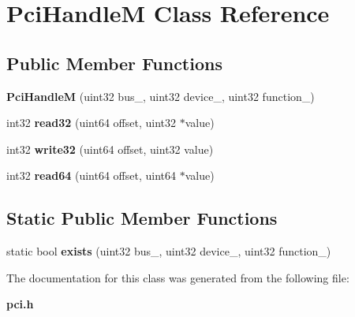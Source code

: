 \section{Pci\+Handle\+M Class Reference}
\label{classPciHandleM}
\subsection*{Public Member Functions}
\begin{DoxyCompactItemize}
\item 
{\bfseries Pci\+Handle\+M} (uint32 bus\+\_\+, uint32 device\+\_\+, uint32 function\+\_\+)\label{classPciHandleM_ad067fc750d7b2f05b9e67badbdf237d3}

\item 
int32 {\bfseries read32} (uint64 offset, uint32 $\ast$value)\label{classPciHandleM_ac9257ce7ae864201459f4db8996de7f6}

\item 
int32 {\bfseries write32} (uint64 offset, uint32 value)\label{classPciHandleM_a412df968cfe50c405aa445c2b52bf6b1}

\item 
int32 {\bfseries read64} (uint64 offset, uint64 $\ast$value)\label{classPciHandleM_a8fced207ab30a888b09ce361d1a45980}

\end{DoxyCompactItemize}
\subsection*{Static Public Member Functions}
\begin{DoxyCompactItemize}
\item 
static bool {\bfseries exists} (uint32 bus\+\_\+, uint32 device\+\_\+, uint32 function\+\_\+)\label{classPciHandleM_a195a5313b1c82370aa5d4f981266498e}

\end{DoxyCompactItemize}


The documentation for this class was generated from the following file\+:\begin{DoxyCompactItemize}
\item 
{\bf pci.\+h}\end{DoxyCompactItemize}
